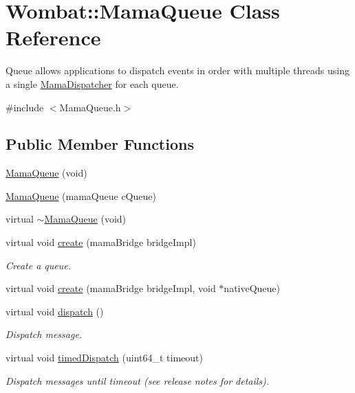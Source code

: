 \hypertarget{classWombat_1_1MamaQueue}{
\section{Wombat::MamaQueue Class Reference}
\label{classWombat_1_1MamaQueue}
}


Queue allows applications to dispatch events in order with multiple threads using a single \hyperlink{classWombat_1_1MamaDispatcher}{MamaDispatcher} for each queue.  


{\ttfamily \#include $<$MamaQueue.h$>$}\subsection*{Public Member Functions}
\begin{DoxyCompactItemize}
\item 
\hyperlink{classWombat_1_1MamaQueue_aca8edd15425492b3eafc994c6e65026b}{MamaQueue} (void)
\item 
\hyperlink{classWombat_1_1MamaQueue_af6ce3367fa838bf1514c10afc3e164e5}{MamaQueue} (mamaQueue cQueue)
\item 
virtual \hyperlink{classWombat_1_1MamaQueue_ab8a03d3c726605d29e77c42196c9a0e9}{$\sim$MamaQueue} (void)
\item 
virtual void \hyperlink{classWombat_1_1MamaQueue_af9697625f1bf25772b29dd4c827c2991}{create} (mamaBridge bridgeImpl)
\begin{DoxyCompactList}\small\item\em Create a queue. \item\end{DoxyCompactList}\item 
virtual void \hyperlink{classWombat_1_1MamaQueue_ab8a04086971890f7a9a7b0eadf4c2a53}{create} (mamaBridge bridgeImpl, void $\ast$nativeQueue)
\item 
virtual void \hyperlink{classWombat_1_1MamaQueue_ad5c395fb2d9b7b97686a685be649f3d7}{dispatch} ()
\begin{DoxyCompactList}\small\item\em Dispatch message. \item\end{DoxyCompactList}\item 
virtual void \hyperlink{classWombat_1_1MamaQueue_adcabd83819f9373cf9662529881b7ed8}{timedDispatch} (uint64\_\-t timeout)
\begin{DoxyCompactList}\small\item\em Dispatch messages until timeout (see release notes for details). \item\end{DoxyCompactList}\item 

\end{DoxyCompactItemize}

